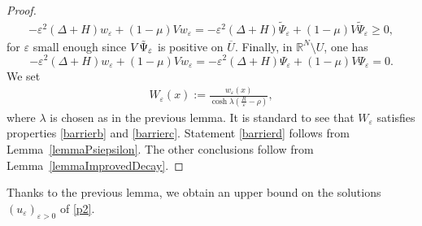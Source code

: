 \documentclass[a4paper]{amsart}
\begin{document}
\begin{proof}
\begin{align*}
 -\varepsilon^2 \left( \Delta + H\right)  w_{\varepsilon} + (1-\mu) V w_{\varepsilon} = -\varepsilon^2  \left( \Delta + H\right)
\tilde{\Psi}_\varepsilon  + (1-\mu) V \tilde{\Psi}_\varepsilon \geq 0,
\end{align*}
for $\varepsilon$ small enough since $V\Tilde{\Psi}_\varepsilon$ is positive on $\overline{U}$.
Finally, in ${\mathbb{R}}^N\setminus U$, one has
\[
 -\varepsilon^2 \left( \Delta + H\right)  w_{\varepsilon} + (1-\mu) V w_{\varepsilon} = -\varepsilon^2  \left( \Delta +
H\right)\Psi_\varepsilon   + (1-\mu) V \Psi_\varepsilon = 0. 
\]
We set
\begin{align*}
 W_{\varepsilon}(x) := \frac{w_{\varepsilon}(x)}{\cosh \lambda \left( \frac{R}{\varepsilon} - \rho\right)},
\end{align*}
where $\lambda$ is chosen as in the previous lemma. It is standard to see that $W_{\varepsilon}$ satisfies properties
\eqref{barrierb} and \eqref{barrierc}. Statement \eqref{barrierd} follows from Lemma~\ref{lemmaPsiepsilon}.
The other conclusions follow from Lemma~\ref{lemmaImprovedDecay}.
\end{proof}

Thanks to the previous lemma, we obtain an upper bound on the solutions $(u_{\varepsilon})_{\varepsilon>0}$ of
\eqref{p2}. 
\end{document}
